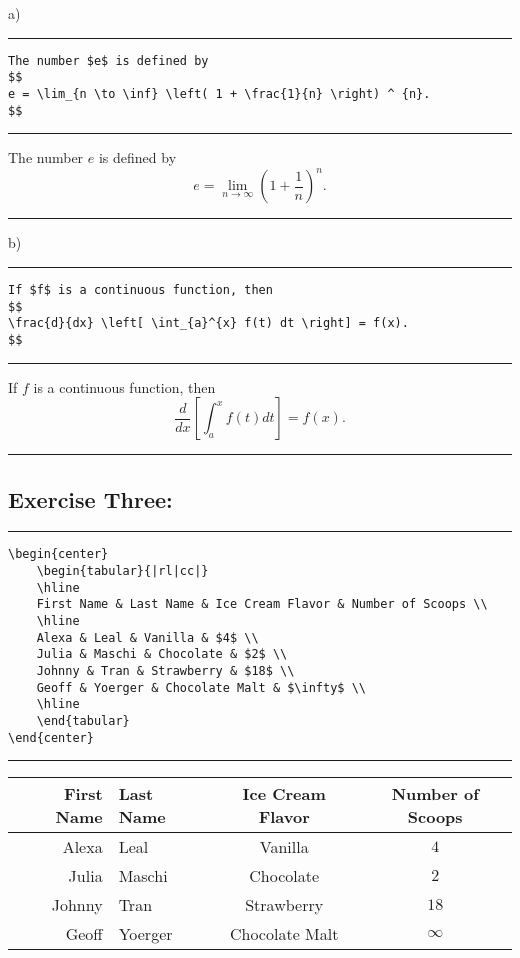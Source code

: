 \documentclass{article} %
\newcommand{\linediv}{\noindent\rule{6.5in}{2pt}}
\newcommand{\linedivm}{\noindent\rule{6.5in}{1pt}}
\begin{document}
\noindent a)

\linediv

\begin{verbatim}
The number $e$ is defined by
$$
e = \lim_{n \to \inf} \left( 1 + \frac{1}{n} \right) ^ {n}.
$$
\end{verbatim}

\linedivm

The number $e$ is defined by
$$
e = \lim_{n \to \infty} \left( 1 + \frac{1}{n} \right) ^ {n}.
$$

\linediv

\noindent b)

\linediv

\begin{verbatim}
If $f$ is a continuous function, then
$$
\frac{d}{dx} \left[ \int_{a}^{x} f(t) dt \right] = f(x).
$$
\end{verbatim}

\linedivm

If $f$ is a continuous function, then
$$
\frac{d}{dx} \left[ \int_{a}^{x} f(t) dt \right] = f(x).
$$

\linediv
 
\subsection*{Exercise Three:}

\linediv

\begin{verbatim}
\begin{center}
    \begin{tabular}{|rl|cc|}
    \hline
    First Name & Last Name & Ice Cream Flavor & Number of Scoops \\
    \hline
    Alexa & Leal & Vanilla & $4$ \\
    Julia & Maschi & Chocolate & $2$ \\
    Johnny & Tran & Strawberry & $18$ \\
    Geoff & Yoerger & Chocolate Malt & $\infty$ \\
    \hline
    \end{tabular}
\end{center}
\end{verbatim}

\linedivm

\begin{center}
    \begin{tabular}{|rl|cc|}
    \hline
    First Name & Last Name & Ice Cream Flavor & Number of Scoops \\
    \hline
    Alexa & Leal & Vanilla & $4$ \\
    Julia & Maschi & Chocolate & $2$ \\
    Johnny & Tran & Strawberry & $18$ \\
    Geoff & Yoerger & Chocolate Malt & $\infty$ \\
    \hline
    \end{tabular}
\end{center}
\end{document}
